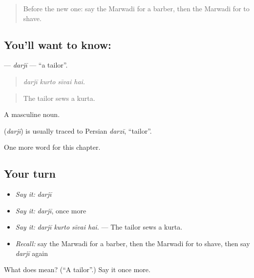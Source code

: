\label{lesson:MW-C265-darji}



\begin{quote}
Before the new one: say the Marwadi for a barber, then the Marwadi for to shave.
\end{quote}

\subsection*{You'll want to know: }
\textbf{} — \emph{darjī} — \textquotedblleft{}a tailor\textquotedblright{}.

\begin{quote}
   
\end{quote}

\begin{quote}
\emph{darjī kurto sīvai hai.}
\end{quote}

\begin{quote}
The tailor sews a kurta.
\end{quote}

A masculine noun.

\begin{cousinweb}
\textbf{} (\emph{darjī}) is usually traced to Persian \emph{darzī}, \textquotedblleft{}tailor\textquotedblright{}.
\end{cousinweb}

\begin{grammarlens}[title={What you've built}]
One more word for this chapter.
\end{grammarlens}

\subsection*{Your turn}
\begin{itemize}
\raggedright
  \item \emph{Say it:} \emph{darjī}
  \item \emph{Say it:} \emph{darjī}, once more
  \item \emph{Say it:} \emph{darjī kurto sīvai hai.} — The tailor sews a kurta.
  \item \emph{Recall:} say the Marwadi for a barber, then the Marwadi for to shave, then say \emph{darjī} again
\end{itemize}

\begin{tcolorbox}[breakable,colback=teal!4,colframe=teal!35!black,title={Before you move on}]
What does  mean? (\textquotedblleft{}A tailor\textquotedblright{}.) Say it once more.
\end{tcolorbox}
